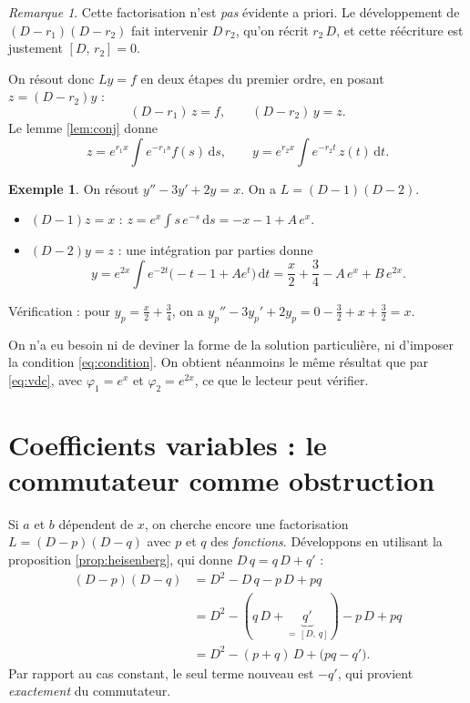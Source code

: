 \documentclass[11pt,a4paper]{article}
\theoremstyle{plain}
\theoremstyle{definition}
\newtheorem{exemple}[theoreme]{Exemple}
\theoremstyle{remark}
\newtheorem{remarque}[theoreme]{Remarque}
\newcommand{\Dx}{D}
\newcommand{\cro}[2]{\left[#1,\,#2\right]}
\newcommand{\dd}{\mathrm{d}}
\begin{document}
\begin{remarque}
Cette factorisation n'est \emph{pas} évidente a priori. Le développement de $(\Dx - r_1)(\Dx - r_2)$ fait intervenir $\Dx\, r_2$, qu'on récrit $r_2\,\Dx$, et cette réécriture est justement $\cro{\Dx}{r_2}=0$.
\end{remarque}

On résout donc $Ly=f$ en deux étapes du premier ordre, en posant $z = (\Dx - r_2)y$ :
\[
  (\Dx - r_1)\,z = f, \qquad (\Dx - r_2)\,y = z .
\]
Le lemme \ref{lem:conj} donne
\[
  z = e^{r_1x}\!\int e^{-r_1 s} f(s)\,\dd s,
  \qquad
  y = e^{r_2x}\!\int e^{-r_2 t}\,z(t)\,\dd t .
\]

\begin{exemple}\label{ex:const}
On résout $y'' - 3y' + 2y = x$. On a $L = (\Dx-1)(\Dx-2)$.
\begin{itemize}[nosep]
\item $(\Dx - 1)z = x$ : $z = e^{x}\int s\,e^{-s}\,\dd s = -x - 1 + A\,e^{x}$.
\item $(\Dx - 2)y = z$ : une intégration par parties donne
\[
  y = e^{2x}\!\int e^{-2t}\big(-t-1+Ae^{t}\big)\,\dd t
    = \frac{x}{2} + \frac34 - A\,e^{x} + B\,e^{2x}.
\]
\end{itemize}
Vérification : pour $y_p = \frac x2 + \frac34$, on a $y_p'' - 3y_p' + 2y_p = 0 - \frac32 + x + \frac32 = x$.
\end{exemple}

On n'a eu besoin ni de deviner la forme de la solution particulière, ni d'imposer la condition \eqref{eq:condition}. On obtient néanmoins le même résultat que par \eqref{eq:vdc}, avec $\varphi_1 = e^{x}$ et $\varphi_2 = e^{2x}$, ce que le lecteur peut vérifier.

\section{Coefficients variables : le commutateur comme obstruction}

Si $a$ et $b$ dépendent de $x$, on cherche encore une factorisation $L = (\Dx - p)(\Dx - q)$ avec $p$ et $q$ des \emph{fonctions}. Développons en utilisant la proposition \ref{prop:heisenberg}, qui donne $\Dx\, q = q\,\Dx + q'$ :
\begin{align*}
  (\Dx - p)(\Dx - q)
  &= \Dx^2 - \Dx\, q - p\,\Dx + pq \\
  &= \Dx^2 - (q\,\Dx + \underbrace{q'}_{=\,\cro{\Dx}{q}}) - p\,\Dx + pq \\
  &= \Dx^2 - (p+q)\,\Dx + \big(pq - q'\big).
\end{align*}
Par rapport au cas constant, le seul terme nouveau est $-q'$, qui provient \emph{exactement} du commutateur.
\end{document}
